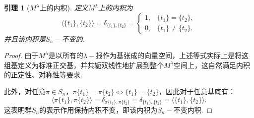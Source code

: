 \documentclass{sjtureport}
\newtheorem{lemma}[theorem]{引理}
\begin{document}
\begin{lemma}[$M^\lambda$上的内积]
    定义$M^\lambda$上的内积为
    \begin{equation*}
        \langle \{t_1\},\{t_2\}\rangle=\delta_{\{t_1\},\{t_2\}}=\begin{cases}
            1, &\{t_1\}=\{t_2\},\\
            0, &\{t_1\}\neq \{t_2\}.
        \end{cases}
    \end{equation*}
    并且该内积是$S_n-\!$不变的.
\end{lemma}
\begin{proof}
    由于$M^\lambda$是以所有的$\lambda-\!$报作为基张成的向量空间，上述等式实际上是将这组基定义为标准正交基，并共轭双线性地扩展到整个$M^\lambda$空间上，这自然满足内积的正定性、对称性等要求. 
    
    此外，对任意$\pi \in S_n$，$\pi\{t_1\}=\pi\{t_2\} \iff \{t_1\}=\{t_2\}$，因此对于任意基底有：
    \begin{equation*}
        \langle \pi \{t_1\},\pi \{t_2\}\rangle = \delta_{\pi \{t_1\},\pi \{t_2\}} = \delta_{\{t_1\},\{t_2\}} = \langle \{t_1\},\{t_2\}\rangle.
    \end{equation*}
    这表明群$S_n$的表示作用保持内积不变，即该内积为$S_n-\!$不变内积.
\end{proof}
\end{document}
